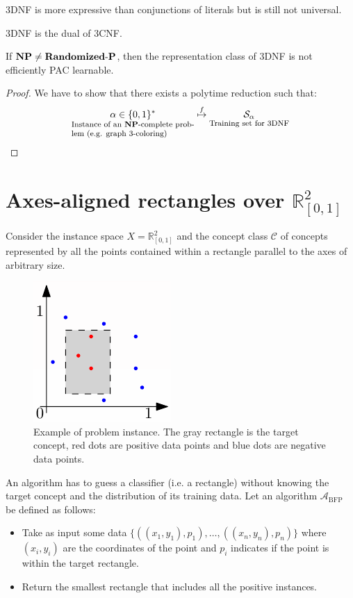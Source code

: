\begin{remark}
    3DNF is more expressive than conjunctions of literals but is still not universal.
\end{remark}

\begin{remark}
    3DNF is the dual of 3CNF.
\end{remark}

\begin{theorem}
    If $\textbf{NP} \neq \text{\textbf{Randomized}-\textbf{P}}$, then the representation class of 3DNF is not efficiently PAC learnable.

    \begin{proof}
        We have to show that there exists a polytime reduction such that:
        \[ 
            \underset{\parbox{4.5cm}{\footnotesize Instance of an \NP-complete problem (e.g. graph 3-coloring)}}{\alpha \in \{ 0, 1 \}^*} 
            \stackrel{f}{\mapsto} 
            \underset{\text{\footnotesize Training set for 3DNF}}{\mathcal{S}_\alpha } 
        \]
    \end{proof}
\end{theorem}



\section{Axes-aligned rectangles over $\mathbb{R}^2_{[0, 1]}$}

Consider the instance space $X = \mathbb{R}^2_{[0, 1]}$
and the concept class $\mathcal{C}$ of concepts represented by all the points contained within a rectangle parallel to the axes of arbitrary size.

\begin{figure}[H]
    \centering
    \includegraphics[width=0.2\linewidth]{./img/_learning_rectangle.pdf}
    \caption{Example of problem instance. The gray rectangle is the target concept, red dots are positive data points and blue dots are negative data points.}
\end{figure}

An algorithm has to guess a classifier (i.e. a rectangle) without knowing the target concept and the distribution of its training data.
Let an algorithm $\mathcal{A}_\text{BFP}$ be defined as follows:
\begin{itemize}
    \item Take as input some data $\{ ((x_1, y_1), p_1), \dots, ((x_n, y_n), p_n) \}$ where 
        $(x_i, y_i)$ are the coordinates of the point and $p_i$ indicates if the point is within the target rectangle.
    \item Return the smallest rectangle that includes all the positive instances.
\end{itemize}

